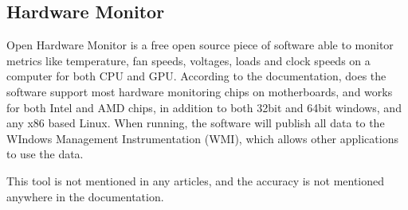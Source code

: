 \subsection{Hardware Monitor}

Open Hardware Monitor is a free open source piece of software able to monitor metrics like temperature, fan speeds, voltages, loads and clock speeds on a computer for both CPU and GPU. According to the documentation, does the software support most hardware monitoring chips on motherboards, and works for both Intel and AMD chips, in addition to both 32bit and 64bit windows, and any x86 based Linux. When running, the software will publish all data to the WIndows Management Instrumentation (WMI), which allows other applications to use the data.\cite[]{open_hardware_monitor}

This tool is not mentioned in any articles, and the accuracy is not mentioned anywhere in the documentation.